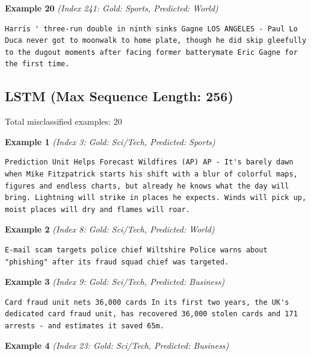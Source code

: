 \noindent
\textbf{Example 20} \quad \textit{(Index 241: Gold: Sports, Predicted: World)}

\begin{Verbatim}[breaklines=true,breakanywhere=true,fontsize=\small]
Harris ' three-run double in ninth sinks Gagne LOS ANGELES - Paul Lo Duca never got to moonwalk to home plate, though he did skip gleefully to the dugout moments after facing former batterymate Eric Gagne for the first time.
\end{Verbatim}

\subsection{LSTM (Max Sequence Length: 256)}
\label{app:run6}

Total misclassified examples: 20

\noindent
\textbf{Example 1} \quad \textit{(Index 3: Gold: Sci/Tech, Predicted: Sports)}

\begin{Verbatim}[breaklines=true,breakanywhere=true,fontsize=\small]
Prediction Unit Helps Forecast Wildfires (AP) AP - It's barely dawn when Mike Fitzpatrick starts his shift with a blur of colorful maps, figures and endless charts, but already he knows what the day will bring. Lightning will strike in places he expects. Winds will pick up, moist places will dry and flames will roar.
\end{Verbatim}

\noindent
\textbf{Example 2} \quad \textit{(Index 8: Gold: Sci/Tech, Predicted: World)}

\begin{Verbatim}[breaklines=true,breakanywhere=true,fontsize=\small]
E-mail scam targets police chief Wiltshire Police warns about "phishing" after its fraud squad chief was targeted.
\end{Verbatim}

\noindent
\textbf{Example 3} \quad \textit{(Index 9: Gold: Sci/Tech, Predicted: Business)}

\begin{Verbatim}[breaklines=true,breakanywhere=true,fontsize=\small]
Card fraud unit nets 36,000 cards In its first two years, the UK's dedicated card fraud unit, has recovered 36,000 stolen cards and 171 arrests - and estimates it saved 65m.
\end{Verbatim}

\noindent
\textbf{Example 4} \quad \textit{(Index 23: Gold: Sci/Tech, Predicted: Business)}

